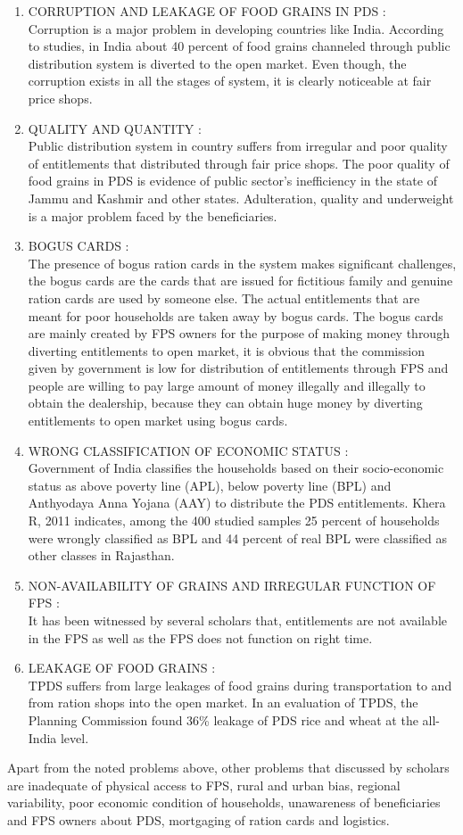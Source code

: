 \documentclass{article}
\begin{document}
\begin{enumerate}
\item CORRUPTION AND LEAKAGE OF FOOD GRAINS IN PDS : \\
Corruption is a major problem in developing countries like India. According to studies, in India about 40 percent of food grains channeled through public distribution system is diverted to the open market. Even though, the corruption exists in all the stages of system, it is clearly noticeable at fair price shops.
\item QUALITY AND QUANTITY : \\
Public distribution system in country suffers from irregular and poor quality of entitlements that distributed through fair price shops. The poor quality of food grains in PDS is evidence of public sector’s inefficiency in the state of Jammu and Kashmir and other states. Adulteration, quality and underweight is a major problem faced by the beneficiaries.
\item BOGUS CARDS : \\
The presence of bogus ration cards in the system makes significant challenges, the bogus cards are the cards that are issued for fictitious family and genuine ration cards are used by someone else. The actual entitlements that are meant for poor households are taken away by bogus cards. The bogus cards are mainly created by FPS owners for the purpose of making money through diverting entitlements to open market, it is obvious that the commission given by government is low for distribution of entitlements through FPS and people are willing to pay large amount of money illegally and illegally to obtain the dealership, because they can obtain huge money by diverting entitlements to open market using bogus cards.
\item WRONG CLASSIFICATION OF ECONOMIC STATUS : \\
Government of India classifies the households based on their socio-economic status as above poverty line (APL), below poverty line (BPL) and Anthyodaya Anna Yojana (AAY) to distribute the PDS entitlements. Khera R, 2011 indicates, among the 400 studied samples 25 percent of households were wrongly classified as BPL and 44 percent of real BPL were classified as other classes in Rajasthan.
\item NON-AVAILABILITY OF GRAINS AND IRREGULAR FUNCTION OF FPS : \\
It has been witnessed by several scholars that, entitlements are not available in the FPS as well as the FPS does not function on right time.
\item LEAKAGE OF FOOD GRAINS : \\
TPDS suffers from large leakages of food grains during transportation to and from ration shops into the open market.  In an evaluation of TPDS, the Planning Commission found 36\% leakage of PDS rice and wheat at the all-India level.
\end{enumerate}
Apart from the noted problems above, other problems that discussed by scholars are inadequate of physical access to FPS, rural and urban bias, regional variability, poor economic condition of households, unawareness of beneficiaries and FPS owners about PDS, mortgaging of ration cards and logistics.
\end{document}
